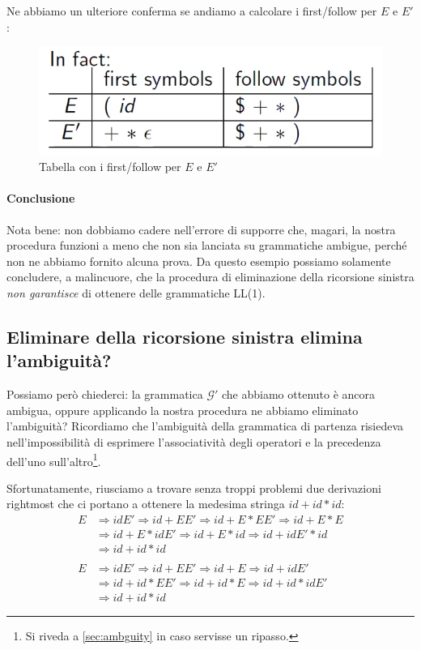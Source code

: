 \documentclass[class=book, crop=false, oneside, 12pt]{standalone}
\begin{document}

Ne abbiamo un ulteriore conferma se andiamo a calcolare i first/follow per \(E\) e \(E'\):
\begin{figure}[H]
    \centering
    \includegraphics[width=.4\textwidth,keepaspectratio]{fxness-lrremove-fftable.png}
    \caption{Tabella con i first/follow per \(E\) e \(E'\)}
    \label{fxness-lrremove- fftable}
\end{figure}

\paragraph{Conclusione}
Nota bene: non dobbiamo cadere nell'errore di supporre che, magari, la nostra procedura funzioni a meno che non sia lanciata su grammatiche ambigue, perché non ne abbiamo fornito alcuna prova. Da questo  esempio possiamo solamente concludere, a malincuore, che la procedura di eliminazione della ricorsione sinistra \emph{non garantisce} di ottenere delle grammatiche LL(1).

\subsection{Eliminare della ricorsione sinistra elimina l'ambiguità?}
Possiamo però chiederci: la grammatica \(\mathcal{G'}\) che abbiamo ottenuto è ancora ambigua, oppure applicando la nostra procedura ne abbiamo eliminato l'ambiguità? Ricordiamo che l'ambiguità della grammatica di partenza risiedeva nell'impossibilità di esprimere l'associatività degli operatori e la precedenza dell'uno sull'altro\footnote{Si riveda a \ref{sec:ambguity} in caso servisse un ripasso.}. 

Sfortunatamente, riusciamo a trovare senza troppi problemi due derivazioni rightmost che ci portano a ottenere la medesima stringa \(id + id * id\):
\begin{align*}
    E &\Rightarrow idE' \Rightarrow id + EE' \Rightarrow id + E * EE' \Rightarrow id + E * E \\
        &\Rightarrow id + E * idE' \Rightarrow id + E * id \Rightarrow id + idE' * id \\
        &\Rightarrow id + id * id 
    \\ \\
    E &\Rightarrow idE' \Rightarrow id + EE' \Rightarrow id + E \Rightarrow id + idE' \\
        &\Rightarrow id + id * EE' \Rightarrow id + id * E \Rightarrow id + id * idE' \\
        &\Rightarrow id + id * id  
\end{align*}
\end{document}
